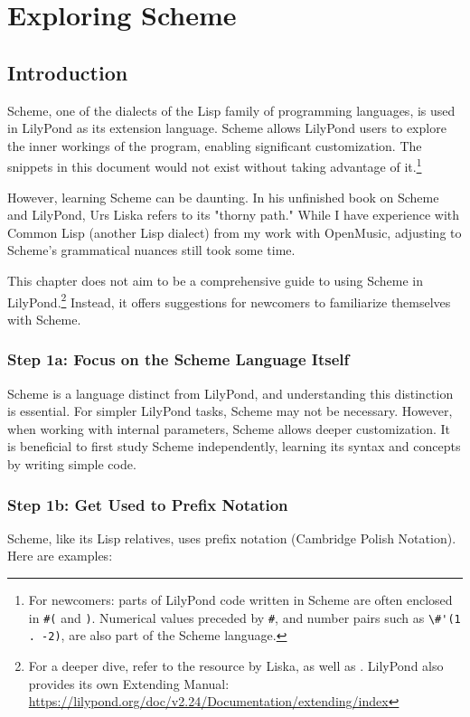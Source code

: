 

\chapter {Exploring Scheme}
\VerbatimFootnotes
\section {Introduction}
Scheme, one of the dialects of the Lisp family of programming languages, is used in LilyPond as its extension language. Scheme allows LilyPond users to explore the inner workings of the program, enabling significant customization. The snippets in this document would not exist without taking advantage of it.\footnote{For newcomers: parts of LilyPond code written in Scheme are often enclosed in \verb+#(+ and \verb+)+. Numerical values preceded by \verb+#+, and number pairs such as \verb+\#'(1 . -2)+, are also part of the Scheme language.} 

However, learning Scheme can be daunting. In his unfinished book on Scheme and LilyPond, Urs Liska refers to its "thorny path."\autocite{RN1739} While I have experience with Common Lisp (another Lisp dialect) from my work with OpenMusic, adjusting to Scheme’s grammatical nuances still took some time.

This chapter does not aim to be a comprehensive guide to using Scheme in LilyPond.\footnote{For a deeper dive, refer to the resource by Liska, as well as \cite{RN1740}. LilyPond also provides its own Extending Manual: \url{https://lilypond.org/doc/v2.24/Documentation/extending/index}} Instead, it offers suggestions for newcomers to familiarize themselves with Scheme.

\subsection{Step 1a: Focus on the Scheme Language Itself}
Scheme is a language distinct from LilyPond, and understanding this distinction is essential. For simpler LilyPond tasks, Scheme may not be necessary. However, when working with internal parameters, Scheme allows deeper customization. It is beneficial to first study Scheme independently, learning its syntax and concepts by writing simple code.

\subsection{Step 1b: Get Used to Prefix Notation}
Scheme, like its Lisp relatives, uses prefix notation (Cambridge Polish Notation). Here are examples:

